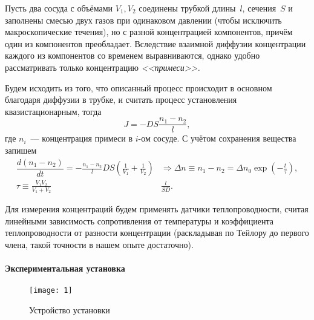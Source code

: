 \documentclass[12pt]{article}
\begin{document}
		Пусть два сосуда с объёмами $V_1, V_2$ соединены трубкой длины~$l$, сечения~$S$
		и заполнены смесью двух газов при одинаковом давлении (чтобы исключить
		макроскопические течения), но с разной концентрацией компонентов, причём один
		из компонентов преобладает.
		Вследствие взаимной диффузии концентрации каждого из компонентов со временем
		выравниваются, однако удобно рассматривать только концентрацию
		\emph{<<примеси>>.}
		
		Будем исходить из того, что описанный процесс происходит в основном благодаря
		диффузии в трубке, и считать процесс установления квазистационарным, тогда
		\begin{equation}
		J = -DS \frac{n_1 - n_2}{l},
		\end{equation}
		где $n_i$~--- концентрация примеси в $i$-ом сосуде. С учётом сохранения
		вещества запишем
		\begin{align}
		\dfrac{d(n_1 - n_2)}{dt} = -\frac{n_1 - n_2}{l} DS \left(\frac{1}{V_1} +
		\frac{1}{V_2}\right)
		&\Rightarrow
		\Delta n \equiv n_1 - n_2 = \Delta n_0 \exp\left(-\frac{t}{\tau}\right),
		\\		
		\tau \equiv \frac{V_1 V_2}{V_1 + V_2}& \frac{l}{SD}.
		\end{align}
		
		Для измерения концентраций будем применять датчики теплопроводности, считая
		линейными зависимость сопротивления от температуры и коэффициента
		теплопроводности от разности концентрации (раскладывая по Тейлору до первого члена, такой точности в нашем опыте достаточно).
		
		\paragraph{Экспериментальная установка}
		
		\begin{figure}[h]
				\texttt{[image: 1]}
				\caption{Устройство установки}
		\end{figure}
\end{document}
